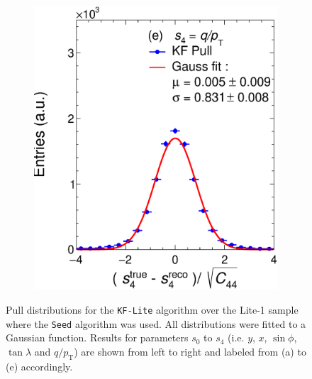 \begin{figure}[t]
\begin{subfigure}{0.32\textwidth}
         \includegraphics[width=\textwidth]{figures/ch4-KF_NDGArLite/MC/ALICE+KF/UnitKFEnd_p4.eps}
         \caption{}
         \label{fig:resp4KF_GArLite_ALICE+KF}
     \end{subfigure}
        \caption[Pull distributions for the \texttt{KF-Lite} algorithm over the Lite-1 sample where the \texttt{Seed} algorithm was used.]{Pull distributions for the \texttt{KF-Lite} algorithm over the Lite-1 sample where the \texttt{Seed} algorithm was used. All distributions were fitted to a Gaussian function. Results for parameters $s_0$ to $s_4$ (i.e. $y$, $x$, $\sin\phi$, $\tan\lambda$ and $q/p_{\text{T}}$) are shown from left to right and labeled from (a) to (e) accordingly. }
        \label{fig:MCUnitKFEnd_GArLite_ALICE+KF}
\end{figure}

